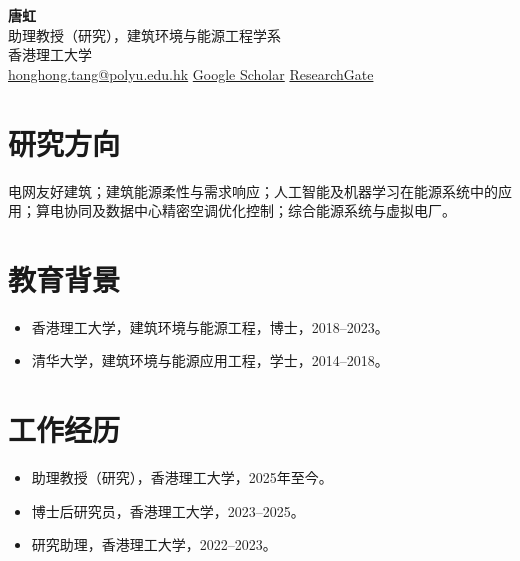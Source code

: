 \documentclass[11pt,a4paper]{ctexart}
\begin{document}
\begin{center}
{\Large\textbf{唐虹}}\\
助理教授（研究），建筑环境与能源工程学系\\
香港理工大学\\
\href{mailto:honghong.tang@polyu.edu.hk}{honghong.tang@polyu.edu.hk} \quad
\href{https://scholar.google.com.hk/citations?user=nXW7KrwAAAAJ&hl=en}{Google Scholar} \quad
\href{https://www.researchgate.net/profile/Hong-Tang-17}{ResearchGate}
\end{center}

\section*{研究方向}
电网友好建筑；建筑能源柔性与需求响应；人工智能及机器学习在能源系统中的应用；算电协同及数据中心精密空调优化控制；综合能源系统与虚拟电厂。

\section*{教育背景}
\begin{itemize}
\item 香港理工大学，建筑环境与能源工程，博士，2018--2023。
\item 清华大学，建筑环境与能源应用工程，学士，2014--2018。
\end{itemize}

\section*{工作经历}
\begin{itemize}
\item 助理教授（研究），香港理工大学，2025年至今。
\item 博士后研究员，香港理工大学，2023--2025。
\item 研究助理，香港理工大学，2022--2023。
\end{itemize}
\end{document}
